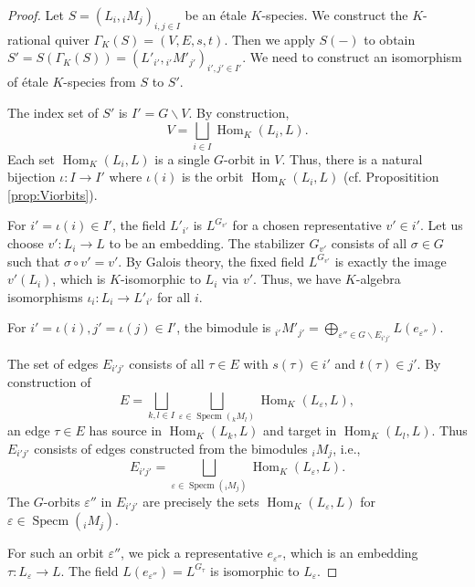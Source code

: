 \documentclass[10pt,a4paper]{amsart}
\DeclareMathOperator{\Hom}{\mathrm{Hom}}
\DeclareMathOperator{\Specm}{\mathrm{Specm}}
\begin{document}
\begin{proof}
    \smallskip
Let $S=(L_i, {}_iM_j)_{i,j\in I}$ be an \'etale $K$-species. We construct the $K$-rational quiver $\Gamma_K(S)=(V,E,s,t)$. Then we apply $S(-)$ to obtain $S' = S(\Gamma_K(S))=(L'_{i'},{}_{i'}M'_{j'})_{i',j'\in I'}$. We need to construct an isomorphism of \'etale $K$-species from $S$ to $S'$.

    \smallskip
     The index set of $S'$ is $I' = G\backslash V$. By construction,
    \[
    V=\bigsqcup\limits_{i\in I}\Hom_K(L_i,L).
    \]
    Each set $\Hom_K(L_i,L)$ is a single $G$-orbit in $V$. Thus, there is a natural bijection $\iota\colon I \to I'$ where $\iota(i)$ is the orbit $\Hom_K(L_i,L)$ (cf. Propositition \ref{prop:Viorbits}).

    \smallskip
     For $i'=\iota(i)\in I'$, the field $L'_{i'}$ is $L^{G_{v'}}$ for a chosen representative $v' \in i'$. Let us choose $v'\colon L_i \to L$ to be an embedding. The stabilizer $G_{v'}$ consists of all $\sigma\in G$ such that $\sigma\circ v' = v'$. By Galois theory, the fixed field $L^{G_{v'}}$ is exactly the image $v'(L_i)$, which is $K$-isomorphic to $L_i$ via $v'$. Thus, we have $K$-algebra isomorphisms $\iota_i\colon L_i \to L'_{i'}$ for all $i$.

    \smallskip
     For $i'=\iota(i), j'=\iota(j) \in I'$, the bimodule is ${}_{i'}M'_{j'} = \bigoplus_{\varepsilon'' \in G\backslash E_{i'j'}} L(e_{\varepsilon''})$.
    
    The set of edges $E_{i'j'}$ consists of all $\tau\in E$ with $s(\tau)\in i'$ and $t(\tau)\in j'$. By construction of
    \[
    E = \bigsqcup\limits_{k,l\in I}\bigsqcup\limits_{\varepsilon\in\Specm({}_kM_l)}\Hom_K(L_\varepsilon,L),
    \]
    an edge $\tau\in E$ has source in $\Hom_K(L_k,L)$ and target in $\Hom_K(L_l,L)$. Thus $E_{i'j'}$ consists of edges constructed from the bimodules ${}_iM_j$, i.e.,
    \[
    E_{i'j'} = \bigsqcup\limits_{\varepsilon\in\Specm({}_iM_j)}\Hom_K(L_\varepsilon,L).
    \]
    The $G$-orbits $\varepsilon''$ in $E_{i'j'}$ are precisely the sets $\Hom_K(L_\varepsilon,L)$ for $\varepsilon \in\Specm({}_iM_j)$.
    
    For such an orbit $\varepsilon''$, we pick a representative $e_{\varepsilon''}$, which is an embedding $\tau\colon L_\varepsilon \to L$. The field $L(e_{\varepsilon''}) = L^{G_{\tau}}$ is isomorphic to $L_\varepsilon$.
    

\end{proof}
\end{document}

